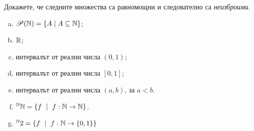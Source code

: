 
\begin{problem}
  Докажете, че следните множества са равномощни и следователно са {\em неизброими}.
  \begin{enumerate}[a)]
  \item
    $\mathscr{P}(\mathbb{N}) = \{A \mid A \subseteq \mathbb{N}\}$;
  \item
    $\mathbb{R}$;
  \item
    интервалът от реални числа $(0,1)$;
  \item
    интервалът от реални числа $[0,1]$;
  \item
    интервалът от реални числа $(a,b)$, за $a<b$.
  \item
    $^\Nat\Nat = \{f\ \mid\ f:\Nat\to\Nat\}$.
  \item
    $^\Nat2 = \{f\ \mid\ f:\Nat\to\{0,1\}\}$
  \end{enumerate}
\end{problem}
